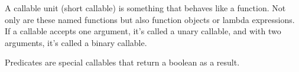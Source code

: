 A callable unit (short callable) is something that behaves like a function. Not only are these named functions but also function objects or lambda expressions. If a callable accepts one argument, it’s called a unary callable, and with two arguments, it’s called a binary callable.

Predicates are special callables that return a boolean as a result.